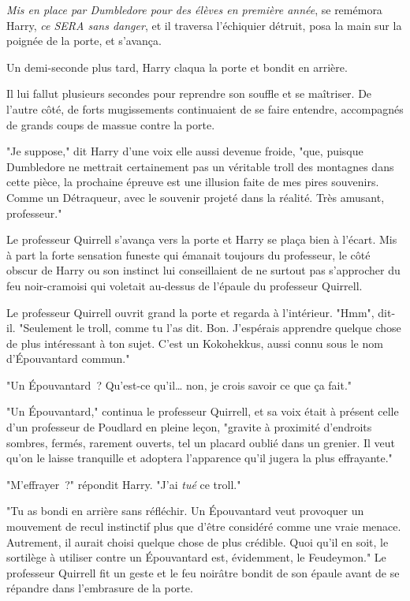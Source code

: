 \emph{Mis en place par Dumbledore pour des élèves en première année}, se remémora Harry, \emph{ce SERA sans danger}, et il traversa l'échiquier détruit, posa la main sur la poignée de la porte, et s'avança.

\later

Un demi-seconde plus tard, Harry claqua la porte et bondit en arrière.

Il lui fallut plusieurs secondes pour reprendre son souffle et se maîtriser. De l'autre côté, de forts mugissements continuaient de se faire entendre, accompagnés de grands coups de massue contre la porte.

"Je suppose," dit Harry d'une voix elle aussi devenue froide, "que, puisque Dumbledore ne mettrait certainement pas un véritable troll des montagnes dans cette pièce, la prochaine épreuve est une illusion faite de mes pires souvenirs. Comme un Détraqueur, avec le souvenir projeté dans la réalité. Très amusant, professeur."

Le professeur Quirrell s'avança vers la porte et Harry se plaça bien à l'écart. Mis à part la forte sensation funeste qui émanait toujours du professeur, le côté obscur de Harry ou son instinct lui conseillaient de ne surtout pas s'approcher du feu noir-cramoisi qui voletait au-dessus de l'épaule du professeur Quirrell.

Le professeur Quirrell ouvrit grand la porte et regarda à l'intérieur. "Hmm", dit-il. "Seulement le troll, comme tu l'as dit. Bon. J'espérais apprendre quelque chose de plus intéressant à ton sujet. C'est un Kokohekkus, aussi connu sous le nom d'Épouvantard commun."

"Un Épouvantard~? Qu'est-ce qu'il… non, je crois savoir ce que ça fait."

"Un Épouvantard," continua le professeur Quirrell, et sa voix était à présent celle d'un professeur de Poudlard en pleine leçon, "gravite à proximité d'endroits sombres, fermés, rarement ouverts, tel un placard oublié dans un grenier. Il veut qu'on le laisse tranquille et adoptera l'apparence qu'il jugera la plus effrayante."

"M'effrayer~?" répondit Harry. "J'ai \emph{tué} ce troll."

"Tu as bondi en arrière sans réfléchir. Un Épouvantard veut provoquer un mouvement de recul instinctif plus que d'être considéré comme une vraie menace. Autrement, il aurait choisi quelque chose de plus crédible. Quoi qu'il en soit, le sortilège à utiliser contre un Épouvantard est, évidemment, le Feudeymon." Le professeur Quirrell fit un geste et le feu noirâtre bondit de son épaule avant de se répandre dans l'embrasure de la porte.

